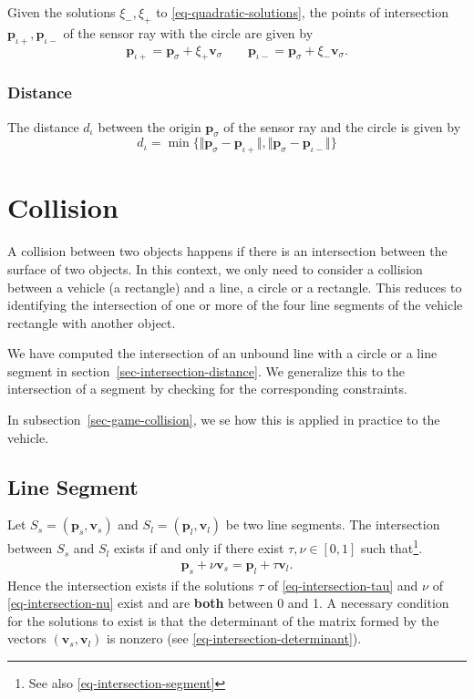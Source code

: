 \documentclass[11pt]{article}
\newcommand{\diota}{d_\iota}
\newcommand{\pbl}{\mathbf{p}_l}
\newcommand{\pbs}{\mathbf{p}_s}
\newcommand{\pbiotp}{\mathbf{p}_{\iota+}}
\newcommand{\pbiotm}{\mathbf{p}_{\iota-}}
\newcommand{\pbsig}{\mathbf{p}_\sigma}
\newcommand{\vbl}{\mathbf{v}_l}
\newcommand{\vbs}{\mathbf{v}_s}
\newcommand{\vbsig}{\mathbf{v}_\sigma}
\begin{document}
Given the solutions $\xi_-,\xi_+$ to \eqref{eq-quadratic-solutions}, the points
of intersection  $\pbiotp,\pbiotm$ of the sensor ray with the circle are given
by
\begin{equation}
    \pbiotp=\pbsig + \xi_+\vbsig\qquad\pbiotm=\pbsig + \xi_-\vbsig.
\end{equation}

\subsubsection*{Distance}

The distance $\diota$ between the origin $\pbsig$ of the sensor ray and the
circle is given by
\begin{equation}
    \diota = \min\{\Vert\pbsig-\pbiotp\Vert,\Vert\pbsig-\pbiotm\Vert\}
    \label{eq-distance-circle}
\end{equation}


\section{Collision}
\label{sec-collision}

A collision between two objects happens if there is an intersection between the
surface of two objects. In this context, we only need
to consider a collision between a vehicle (a rectangle) and a line, a circle
or a rectangle. This reduces to identifying the intersection of one or more
of the four line segments of the vehicle rectangle with another object.

We have computed the intersection of an unbound line with a circle or a
line segment in section~\ref{sec-intersection-distance}. We generalize this to
the intersection of a segment by checking for the corresponding constraints.

In subsection~\ref{sec-game-collision}, we se how this is applied in
practice to the vehicle.

\subsection{Line Segment}
\label{sec-collision-line-segment}

Let $S_s=(\pbs,\vbs)$ and $S_l=(\pbl,\vbl)$ be two line segments. The
intersection between $S_s$ and $S_l$ exists if and only if there exist
$\tau,\nu\in[0,1]$ such that\footnote{See also
\eqref{eq-intersection-segment}}.
\begin{eqnarray}
    \pbs + \nu \vbs = \pbl + \tau \vbl. \label{eq-collision-segment}
\end{eqnarray}
Hence the intersection exists if the solutions
$\tau$ of \eqref{eq-intersection-tau} and $\nu$ of \eqref{eq-intersection-nu}
exist and are \textbf{both} between 0 and 1. A necessary condition for the
solutions to exist is that the determinant of the matrix formed by the vectors
$(\vbs,\vbl)$ is nonzero (see \eqref{eq-intersection-determinant}).
\end{document}
